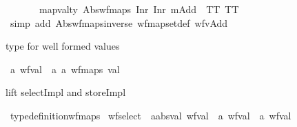 \begin{isabellebody}
\ \ \isamarkupfalse%
%
\isadelimproof
\ %
\endisadelimproof
%
\isatagproof
\isakeywordONE{{\isachardot}{\kern0pt}{\isachardot}{\kern0pt}}\isamarkupfalse%
%
\endisatagproof
{\isafoldproof}%
%
\isadelimproof
%
\endisadelimproof
\ \isamarkupfalse%
\isanewline
\isanewline
\isanewline
{}\isamarkupfalse%
\ {\isachardoublequoteopen}mapval{\isacharunderscore}{\kern0pt}ty\ {\isacharparenleft}{\kern0pt}Abs{\isacharunderscore}{\kern0pt}wf{\isacharunderscore}{\kern0pt}maps\ {\isacharparenleft}{\kern0pt}Inr\ {\isacharparenleft}{\kern0pt}Inr\ mAdd{}{\isacharparenright}{\kern0pt}{\isacharparenright}{\kern0pt}{\isacharparenright}{\kern0pt}\ {\isacharequal}{\kern0pt}\ {\isacharparenleft}{\kern0pt}TT{\isacharcomma}{\kern0pt}\ TT{\isacharparenright}{\kern0pt}{\isachardoublequoteclose}\isanewline
%
\isadelimproof
\ \ %
\endisadelimproof
%
\isatagproof
{}\isamarkupfalse%
\ {\isacharparenleft}{\kern0pt}simp\ add{\isacharcolon}{\kern0pt}\ Abs{\isacharunderscore}{\kern0pt}wf{\isacharunderscore}{\kern0pt}maps{\isacharunderscore}{\kern0pt}inverse\ wf{\isacharunderscore}{\kern0pt}map{\isacharunderscore}{\kern0pt}set{\isacharunderscore}{\kern0pt}def\ wf{\isacharunderscore}{\kern0pt}vAdd{}{\isacharparenright}{\kern0pt}%
\endisatagproof
{\isafoldproof}%
%
\isadelimproof
%
\endisadelimproof
%
\begin{isamarkuptext}%
type for well formed values%
\end{isamarkuptext}\isamarkuptrue%
\isamarkupfalse%
\ {\isacharprime}{\kern0pt}a\ wf{\isacharunderscore}{\kern0pt}val\ {\isacharequal}{\kern0pt}\ {\isachardoublequoteopen}{\isacharparenleft}{\kern0pt}{\isacharprime}{\kern0pt}a{\isacharcomma}{\kern0pt}\ {\isacharprime}{\kern0pt}a\ wf{\isacharunderscore}{\kern0pt}maps{\isacharparenright}{\kern0pt}\ val{\isachardoublequoteclose}%
\begin{isamarkuptext}%
lift selectImpl and storeImpl%
\end{isamarkuptext}\isamarkuptrue%
\isamarkupfalse%
\ type{\isacharunderscore}{\kern0pt}definition{\isacharunderscore}{\kern0pt}wf{\isacharunderscore}{\kern0pt}maps\isanewline
\isanewline
{}\isamarkupfalse%
\ wf{\isacharunderscore}{\kern0pt}select\ {\isacharcolon}{\kern0pt}{\isacharcolon}{\kern0pt}\ {\isachardoublequoteopen}{\isacharprime}{\kern0pt}a{\isacharcolon}{\kern0pt}{\isacharcolon}{\kern0pt}absval\ wf{\isacharunderscore}{\kern0pt}val\ {\isasymRightarrow}\ {\isacharprime}{\kern0pt}a\ wf{\isacharunderscore}{\kern0pt}val\ {\isasymRightarrow}\ {\isacharprime}{\kern0pt}a\ wf{\isacharunderscore}{\kern0pt}val{\isachardoublequoteclose}\isanewline

\end{isabellebody}

